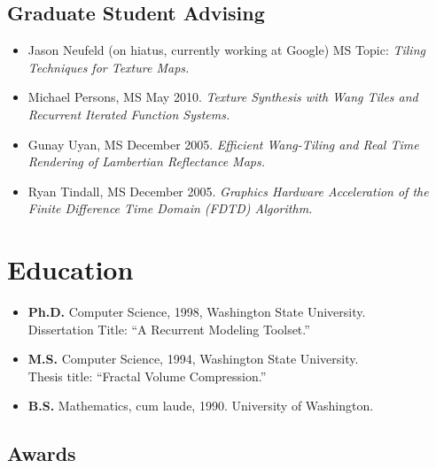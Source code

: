 \documentclass[10pt]{article}
\begin{document}
\subsection*{Graduate Student Advising}
\begin{itemize}
\item Jason Neufeld (on hiatus, currently working at Google) MS Topic: {\em Tiling Techniques for Texture Maps.}
\item Michael Persons, MS May 2010.
  {\em Texture Synthesis with Wang Tiles and Recurrent Iterated Function Systems.}
\item Gunay Uyan, MS December 2005. {\em Efficient Wang-Tiling and Real Time
   Rendering of Lambertian Reflectance Maps.}
\item Ryan Tindall, MS December 2005. {\em Graphics Hardware Acceleration
   of the Finite Difference Time Domain (FDTD) Algorithm.}
\end{itemize}


\section*{Education}

\begin{itemize}
\item {\bf Ph.D.} Computer Science, 1998,
Washington State University. \\
Dissertation Title: ``A Recurrent Modeling Toolset.''

\item {\bf M.S.} Computer Science, 1994,
Washington State University. \\
Thesis title: ``Fractal Volume Compression.''

\item {\bf B.S.} Mathematics, cum laude, 1990.
University of Washington. 
\end{itemize}

\subsection*{Awards}
\end{document}
